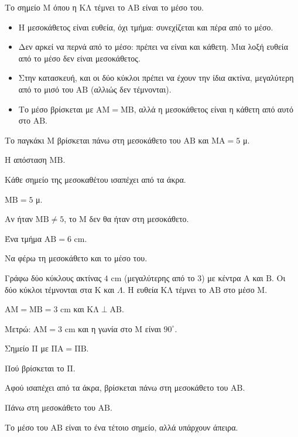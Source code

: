 Το σημείο $\mathrm{Μ}$ όπου η $\mathrm{ΚΛ}$ τέμνει το $\mathrm{ΑΒ}$ είναι το μέσο του.

\begin{prosoxi}
\begin{itemize}[leftmargin=1.2em,itemsep=0.3ex,topsep=2pt]
\item Η μεσοκάθετος είναι ευθεία, όχι τμήμα: συνεχίζεται και πέρα από το μέσο.
\item Δεν αρκεί να περνά από το μέσο: πρέπει να είναι και κάθετη. Μια λοξή ευθεία από το μέσο δεν είναι μεσοκάθετος.
\item Στην κατασκευή, και οι δύο κύκλοι πρέπει να έχουν την ίδια ακτίνα, μεγαλύτερη από το μισό του $\mathrm{ΑΒ}$ (αλλιώς δεν τέμνονται).
\item Το μέσο βρίσκεται με $\mathrm{ΑΜ}=\mathrm{ΜΒ}$, αλλά η μεσοκάθετος είναι η κάθετη από αυτό στο $\mathrm{ΑΒ}$.
\end{itemize}
\end{prosoxi}


\tixero Το παγκάκι $\mathrm{Μ}$ βρίσκεται πάνω στη μεσοκάθετο του $\mathrm{ΑΒ}$ και $\mathrm{ΜΑ}=5$ μ.\par
\tithelo Η απόσταση $\mathrm{ΜΒ}$.\par
\possindeo Κάθε σημείο της μεσοκαθέτου ισαπέχει από τα άκρα.\par
\apantisi $\mathrm{ΜΒ}=5$ μ.\par
\elegxos Αν ήταν $\mathrm{ΜΒ}\neq5$, το $\mathrm{Μ}$ δεν θα ήταν στη μεσοκάθετο.

\tixero Ένα τμήμα $\mathrm{ΑΒ}=6$ cm.\par
\tithelo Να φέρω τη μεσοκάθετο και το μέσο του.\par
\possindeo Γράφω δύο κύκλους ακτίνας $4$ cm (μεγαλύτερης από το $3$) με κέντρα $\mathrm{Α}$ και $\mathrm{Β}$. Οι δύο κύκλοι τέμνονται στα $\mathrm{Κ}$ και $\Lambda$. Η ευθεία $\mathrm{ΚΛ}$ τέμνει το $\mathrm{ΑΒ}$ στο μέσο $\mathrm{Μ}$.\par
\apantisi $\mathrm{ΑΜ}=\mathrm{ΜΒ}=3$ cm και $\mathrm{ΚΛ}\perp\mathrm{ΑΒ}$.\par
\elegxos Μετρώ: $\mathrm{ΑΜ}=3$ cm και η γωνία στο $\mathrm{Μ}$ είναι $90^\circ$.

\tixero Σημείο $\mathrm{Π}$ με $\mathrm{ΠΑ}=\mathrm{ΠΒ}$.\par
\tithelo Πού βρίσκεται το $\mathrm{Π}$.\par
\possindeo Αφού ισαπέχει από τα άκρα, βρίσκεται πάνω στη μεσοκάθετο του $\mathrm{ΑΒ}$.\par
\apantisi Πάνω στη μεσοκάθετο του $\mathrm{ΑΒ}$.\par
\elegxos Το μέσο του $\mathrm{ΑΒ}$ είναι το ένα τέτοιο σημείο, αλλά υπάρχουν άπειρα.

